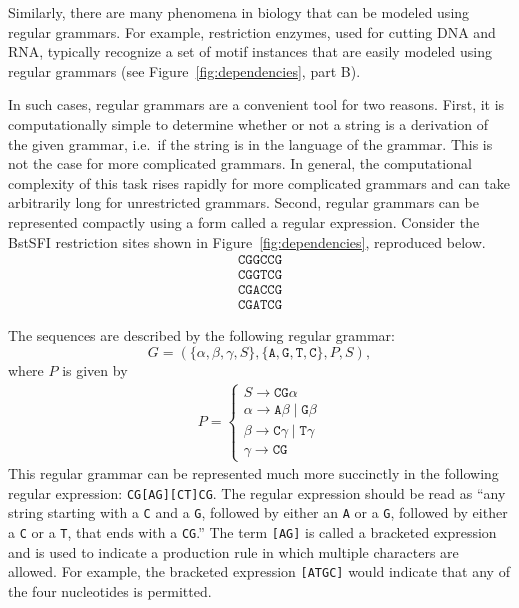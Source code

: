     Similarly, there are many phenomena in biology that can be
    modeled using regular grammars.  For example, restriction
    enzymes, used for cutting DNA and RNA, typically recognize a set
    of motif instances that are easily modeled using regular
    grammars (see Figure~\vref{fig:dependencies}, part B).

    In such cases, regular grammars are a convenient tool for two
    reasons.  First, it is computationally simple to determine
    whether or not a string is a derivation of the given grammar,
    i.e.\ if the string is in the language of the grammar.  This is
    not the case for more complicated grammars.  In general, the
    computational complexity of this task rises rapidly for more
    complicated grammars and can take arbitrarily long for
    unrestricted grammars.  Second, regular grammars can be
    represented compactly using a form called a regular expression.
    Consider the BstSFI restriction sites shown in
    Figure~\ref{fig:dependencies}, reproduced below.
    \begin{equation}\label{eqn:bstsfi}
        \begin{split}
           \texttt{CGGCCG}\\
           \texttt{CGGTCG}\\
           \texttt{CGACCG}\\
           \texttt{CGATCG}
        \end{split}
    \end{equation}

The sequences are described by the following regular grammar:
\begin{equation}\label{eqn:bstsfiGrammar}
    G = (\{\alpha, \beta, \gamma, S\},\{\texttt{A}, \texttt{G},\texttt{T},\texttt{C}\},P,S),
\end{equation}
where $P$ is given by
\begin{align}\label{eqn:bstsfiProduction}
    P =
    \begin{cases}
    S \rightarrow \texttt{CG}\alpha \\
    \alpha \rightarrow \texttt{A}\beta \mid \texttt{G}\beta \\
    \beta \rightarrow \texttt{C}\gamma \mid \texttt{T}\gamma \\
    \gamma \rightarrow \texttt{CG}
    \end{cases}
\end{align}
This regular grammar can be represented much more succinctly in the
following regular expression: \texttt{CG[AG][CT]CG}.  The regular
expression should be read as ``any string starting with a \texttt{C}
and a \texttt{G}, followed by either an \texttt{A} or a \texttt{G},
followed by either a \texttt{C} or a \texttt{T}, that ends with a
\texttt{CG}.''  The term \texttt{[AG]} is called a bracketed
expression and is used to indicate a production rule in which
multiple characters are allowed.  For example, the bracketed
expression \texttt{[ATGC]} would indicate that any of the four
nucleotides is permitted.

